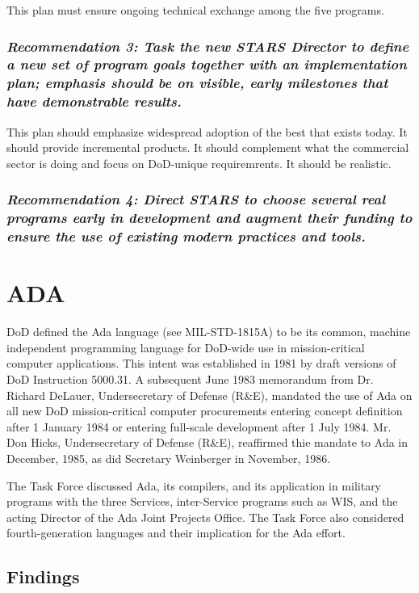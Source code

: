 \documentclass[12pt,final]{article}
\begin{document}
This plan must ensure ongoing technical exchange among the five programs.

\label{rec:3}
\subsubsection*{\textit{Recommendation 3: Task the new STARS Director to define a new set of
program goals together with an implementation plan; emphasis should be on
visible, early milestones that have demonstrable results.}}

This plan should emphasize widespread adoption of the best that exists today.
It should provide incremental products. It should complement what the
commercial sector is doing and focus on DoD-unique requiremrents. It should be
realistic.

\label{rec:4}
\subsubsection*{\textit{Recommendation 4: Direct STARS to choose several real
programs early in development and augment their funding to ensure the use of
existing modern practices and tools.}}

\section{ADA}

DoD defined the Ada language (see MIL-STD-1815A) to be its common,
machine independent programming language for DoD-wide use in mission-critical
computer applications. This intent was established in 1981 by draft versions of
DoD Instruction 5000.31. A subsequent June 1983 memorandum from Dr. Richard
DeLauer, Undersecretary of Defense (R\&E), mandated the use of Ada on all new
DoD mission-critical computer procurements entering concept definition after 1
January 1984 or entering full-scale development after 1 July 1984. Mr. Don
Hicks, Undersecretary of Defense (R\&E), reaffirmed thie mandate to Ada in
December, 1985, as did Secretary Weinberger in November, 1986.

The Task Force discussed Ada, its compilers, and its application in military
programs with the three Services, inter-Service programs such as WIS, and the
acting Director of the Ada Joint Projects Office. The Task Force also
considered fourth-generation languages and their implication for the Ada
effort.

\subsection*{Findings}
\end{document}
